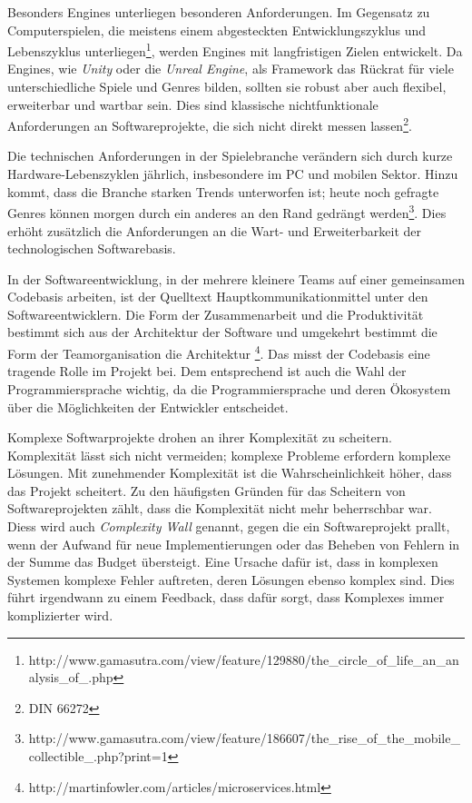 Besonders Engines unterliegen besonderen Anforderungen. Im Gegensatz zu Computerspielen, die meistens einem abgesteckten Entwicklungszyklus und Lebenszyklus unterliegen\footnote{http://www.gamasutra.com/view/feature/129880/the\_circle\_of\_life\_an\_analysis\_of\_.php}, werden Engines mit langfristigen Zielen entwickelt. Da Engines, wie \textit{Unity} oder die \textit{Unreal Engine}, als Framework das Rückrat für viele unterschiedliche Spiele und Genres bilden, sollten sie robust aber auch flexibel, erweiterbar und wartbar sein. Dies sind klassische nichtfunktionale Anforderungen an Softwareprojekte, die sich nicht direkt messen lassen\footnote{DIN 66272}.

Die technischen Anforderungen in der Spielebranche verändern sich durch kurze Hardware-Lebenszyklen jährlich, insbesondere im PC und mobilen Sektor. Hinzu kommt, dass die Branche starken Trends unterworfen ist; heute noch gefragte Genres können morgen durch ein anderes an den Rand gedrängt werden\footnote{http://www.gamasutra.com/view/feature/186607/the\_rise\_of\_the\_mobile\_collectible\_.php?print=1}. Dies erhöht zusätzlich die Anforderungen an die Wart- und Erweiterbarkeit der technologischen Softwarebasis.

In der Softwareentwicklung, in der mehrere kleinere Teams auf einer gemeinsamen Codebasis arbeiten, ist der Quelltext Hauptkommunikationmittel unter den Softwareentwicklern. Die Form der Zusammenarbeit und die Produktivität bestimmt sich aus der Architektur der Software und umgekehrt bestimmt die Form der Teamorganisation die Architektur \parencite[Foreword, Seite xix u. Kapitel 1, Seite 13f]{Martin2008}\footnote{http://martinfowler.com/articles/microservices.html
}. Das misst der Codebasis eine tragende Rolle im Projekt bei. Dem entsprechend ist auch die Wahl der Programmiersprache wichtig, da die Programmiersprache und deren Ökosystem über die Möglichkeiten der Entwickler entscheidet.

Komplexe Softwarprojekte drohen an ihrer Komplexität zu scheitern. Komplexität lässt sich nicht vermeiden; komplexe Probleme erfordern komplexe Lösungen. Mit zunehmender Komplexität ist die Wahrscheinlichkeit höher, dass das Projekt scheitert. Zu den häufigsten Gründen für das Scheitern von Softwareprojekten zählt, dass die Komplexität nicht mehr beherrschbar war. Diess wird auch \textit{Complexity Wall} genannt, gegen die ein Softwareprojekt prallt, wenn der Aufwand für neue Implementierungen oder das Beheben von Fehlern in der Summe das Budget übersteigt. Eine Ursache dafür ist, dass in komplexen Systemen komplexe Fehler auftreten, deren Lösungen ebenso komplex sind. Dies führt irgendwann zu einem Feedback, dass dafür sorgt, dass Komplexes immer komplizierter wird.

